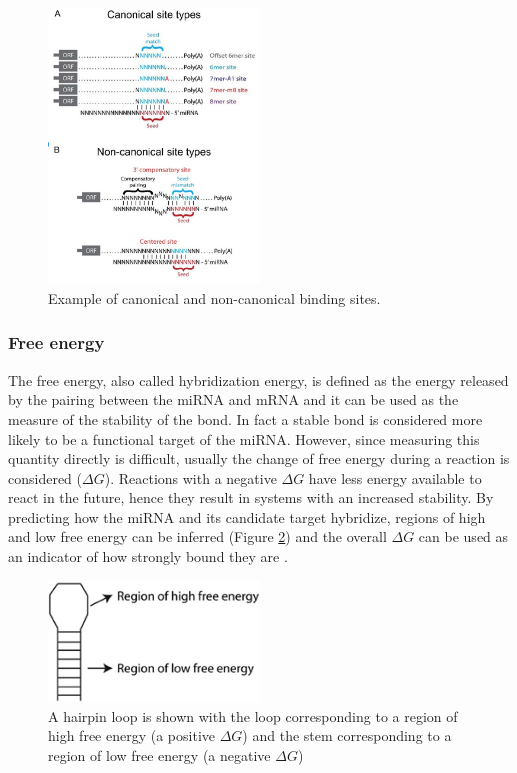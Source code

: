 \begin{figure}[hbt!]
	\centering
	\includegraphics[width=0.5\textwidth]{Figures/canonical_noncanonical}
	\caption{Example of canonical and non-canonical binding sites.}
	\label{fig:canonical_binding}
\end{figure}

\subsubsection{Free energy}
The free energy, also called hybridization energy,  is defined as the energy released by the pairing between the miRNA and mRNA and it can be used as the measure of the stability of the bond. In fact a stable bond is considered more likely to be a functional target of the miRNA. However, since measuring this quantity directly is difficult, usually the change of free energy during a reaction is considered ($\Delta G$). Reactions with a negative $\Delta G$ have less energy available to react in the future, hence they result in systems with an increased stability. By predicting how the miRNA and its candidate target hybridize, regions of high and low free energy can be inferred (Figure \ref{fig:free_energy}) and the overall $\Delta G$ can be used as an indicator of how strongly bound they are \cite{free_energy_survey}.

\begin{figure}[hbt!]
	\centering
	\includegraphics[width=0.5\textwidth]{Figures/free_energy}
	\caption{A hairpin loop is shown with the loop corresponding to a region of high free energy (a positive $\Delta G$) and the stem corresponding to a region of low free energy (a negative $\Delta G$)}
	\label{fig:free_energy}
\end{figure}

